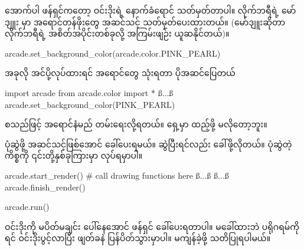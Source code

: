 အောက်ပါ ဖန်ရှင်ကတော့ ဝင်းဒိုးရဲ့ နောက်ခံရောင် သတ်မှတ်တာပါ။ လိုက်ဘရီရဲ့  မော်ဒျူး  မှာ အရောင်တန်ဖိုးတွေ အဆင်သင့် သတ်မှတ်ပေးထားတယ်။ (မော်ဒျူးဆိုတာ လိုက်ဘရီရဲ့ အစိတ်အပိုင်းတစ်ခုလို့ အကြမ်းဖျဉ်း ယူဆနိုင်တယ်)။ 
%
\begin{py}
arcade.set_background_color(arcade.color.PINK_PEARL)
\end{py}
%
အခုလို အင်ပို့လုပ်ထားရင် အရောင်တွေ သုံးရတာ ပိုအဆင်ပြေတယ်
%
\begin{py}
import arcade
from arcade.color import *
ß$\ldots$ß
arcade.set_background_color(PINK_PEARL)
\end{py}
%
\fEn{,}  စသည်ဖြင့် အရောင်နံမည် တမ်းရေးလို့ရတယ်။ ရှေ့မှာ  ထည့်ဖို့  မလိုတော့ဘူး။

ပုံဆွဲဖို့ အဆင်သင့်ဖြစ်အောင်  ခေါ်ပေးရမယ်။ ဆွဲပြီးရင်လည်း  ခေါ်ဖို့လိုတယ်။ ပုံဆွဲတဲ့ကိစ္စကို ၎င်းတို့နှစ်ခုကြားမှာ  လုပ်ရမှာပါ။
%
\begin{py}
arcade.start_render()
# call drawing functions here
ß$\ldots$ß
ß$\ldots$ß
arcade.finish_render()
\end{py}
%
\betweenminted{\medskipamount}
%
\begin{py}
arcade.run()
\end{py}
%
ဝင်းဒိုးကို မပိတ်မချင်း ပေါ်နေအောင်  ဖန်ရှင် ခေါ်ပေးရတာပါ။ မခေါ်ထားဘဲ ပရိုဂရမ်ကို  ရင် ဝင်းဒိုးပွင့်လာပြီး ဖျတ်ခနဲ ပြန်ပိတ်သွားမှာပါ။ မကျန်ခဲ့ဖို့ သတိပြုရပါမယ်။

